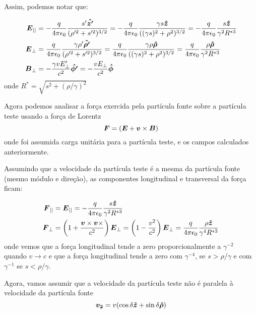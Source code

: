 \begin{apendicesenv}
    Assim, podemos notar que:

    \begin{align}
		\boldsymbol{E}_{||} &= -\frac{q}{4\pi\epsilon_0} \frac{s'\boldsymbol{\hat{z'}}}{(\rho'^2+s'^2)^{3/2}} =
				 -\frac{q}{4\pi\epsilon_0} \frac{\gamma s\boldsymbol{\hat{z}}}{((\gamma s)^2+\rho^2)^{3/2}}=
                 -\frac{q}{4\pi\epsilon_0} \frac{s\boldsymbol{\hat{z}}}{\gamma^2R^{*3}} \\
		\boldsymbol{E}_\perp&= \frac{q}{4\pi\epsilon_0}\frac{\gamma \rho'\boldsymbol{\hat{\rho'}}}{(\rho'^2+s'^2)^{3/2}} =
				 \frac{q}{4\pi\epsilon_0}\frac{\gamma \rho\boldsymbol{\hat{\rho}}}{((\gamma s)^2+\rho^2)^{3/2}}=
                 \frac{q}{4\pi\epsilon_0} \frac{\rho\boldsymbol{\hat{\rho}}}{\gamma^2R^{*3}} \\
		\boldsymbol{B}_\perp&= -\frac{\gamma   vE'_\perp}{c^2}\boldsymbol{\hat{\phi'}} =
		         -\frac{vE_\perp}{c^2}\boldsymbol{\hat{\phi}}
    \end{align}
    onde $R^* = \sqrt{s^2+\left(\rho/\gamma\right)^2}$

    Agora podemos analisar a força exercida pela partícula fonte sobre a partícula teste usando a força de Lorentz
    \begin{equation}
    	\boldsymbol{F} = \left(\boldsymbol{E} + \boldsymbol{v}\times\boldsymbol{B}\right)
    \end{equation}
    onde foi assumida carga unitária para a partícula teste, e os campos calculados anteriormente.

    Assumindo que a velocidade da partícula teste é a mesma da partícula fonte (mesmo módulo e direção), as componentes longitudinal e transversal da força ficam:

    \begin{align}
		\boldsymbol{F}_{||} &= \boldsymbol{E}_{||} = -\frac{q}{4\pi\epsilon_0} \frac{s\boldsymbol{\hat{z}}}{\gamma^2R^{*3}}\\
		\boldsymbol{F}_\perp&= \left(1+\frac{\boldsymbol{v}\times\boldsymbol{v}\times}{c^2}\right)\boldsymbol{E}_\perp =
                 \left(1-\frac{v^2}{c^2}\right)\boldsymbol{E}_\perp =
                 \frac{q}{4\pi\epsilon_0} \frac{\rho\boldsymbol{\hat{z}}}{\gamma^4R^{*3}}
    \end{align}
    onde vemos que a força longitudinal tende a zero proporcionalmente a $\gamma^{-2}$ quando $v \to c$ e que a força longitudinal tende a zero com $\gamma^{-4}$, se $s>\rho/\gamma$ e com $\gamma^{-1}$ se $s<\rho/\gamma$.

    Agora, vamos assumir que a velocidade da partícula teste não é paralela à velocidade da partícula fonte
    \begin{equation}
    	\boldsymbol{v_2} = v(\cos\delta \boldsymbol{\hat{z}} + \sin\delta\boldsymbol{\hat{\rho}})
    \end{equation}


\end{apendicesenv}
